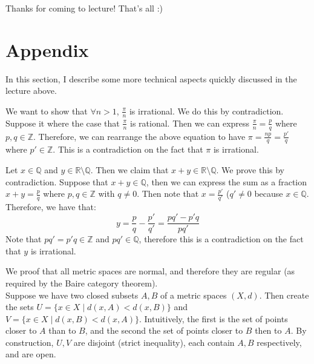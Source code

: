 \documentclass[english, 11pt]{article}
\begin{document}
  Thanks for coming to lecture! That's all :)

  \section{Appendix}
  In this section, I describe some more technical aspects quickly discussed in the lecture above.
  \begin{prop}
  \label{prop:pi_n_irrational}
  We want to show that $\forall n > 1$, $\frac{\pi}{n}$ is irrational. We do this by contradiction. Suppose it where the case that $\frac{\pi}{n}$ is rational. Then we can express $\frac{\pi}{n} = \frac{p}{q}$ where $p,q \in \mathbb{Z}$. Therefore, we can rearrange the above equation to have $\pi = \frac{np}{q} = \frac{p'}{q}$ where $p' \in \mathbb{Z}$. This is a contradiction on the fact that $\pi$ is irrational.
  \end{prop}

  \begin{prop}
  \label{prop:sum_rational_irrational}
  Let $x \in \mathbb{Q}$ and $y \in \mathbb{R} \setminus \mathbb{Q}$. Then we claim that $x + y \in \mathbb{R}\setminus \mathbb{Q}$. We prove this by contradiction. Suppose that $x + y \in \mathbb{Q}$, then we can express the sum as a fraction $x + y = \frac{p}{q}$ where $p,q \in \mathbb{Z}$ with $q \neq 0$. Then note that $x = \frac{p'}{q'}$ ($q' \neq 0$ because $x \in \mathbb{Q}$. Therefore, we have that:
  $$
  y = \frac{p}{q} - \frac{p'}{q'} = \frac{pq' - p'q}{pq'}
  $$
  Note that $pq' = p'q \in \mathbb{Z}$ and $pq' \in \mathbb{Q}$, therefore this is a contradiction on the fact that $y$ is irrational.
  \end{prop}

  \begin{prop}
  \label{prop:metric_spaces_regular}
  We proof that all metric spaces are normal, and therefore they are regular (as required by the Baire category theorem).\\
  Suppose we have two closed subsets $A,B$ of a metric spaces $(X,d)$. Then create the sets $U = \{x \in X \mid d(x,A) < d(x,B)\}$ and $V = \{x \in X \mid d(x,B) < d(x,A)\}$. Intuitively, the first is the set of points closer to $A$ than to $B$, and the second the set of points closer to $B$ then to $A$. By construction, $U,V$ are disjoint (strict inequality), each contain $A,B$ respectively, and are open.
  \end{prop}
\end{document}
